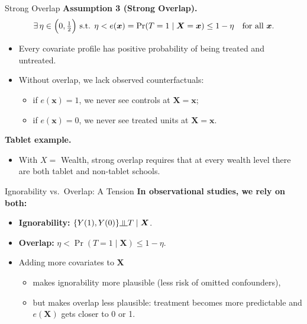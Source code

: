 \documentclass[10pt]{beamer}
\newcommand{\indep}{\rotatebox[origin=c]{90}{$\models$}}
\theoremstyle{plain}
\newcommand{\bx}{\bm{x}}
\newcommand{\bX}{\bm{X}}
\begin{document}
\begin{frame}{Strong Overlap}
  \textbf{Assumption 3 (Strong Overlap).}
  \[
    \exists\,\eta \in \Bigl(0,\tfrac{1}{2}\Bigr) \text{ s.t. } \eta < e(\bx) = \Pr(T=1 \mid \bX = \bx) \le 1-\eta
    \quad\text{for all } \bx.
  \]
  \pause
  \begin{itemize}
    \item Every covariate profile has positive probability of being treated and untreated.
    \item Without overlap, we lack observed counterfactuals:
    \pause
    \begin{itemize}
      \item if \(e(\bx)=1\), we never see controls at \(\bX=\bx\);
      \item if \(e(\bx)=0\), we never see treated units at \(\bX=\bx\).
    \end{itemize}
  \end{itemize}
  \vspace{0.5cm}
  \pause
  \textbf{Tablet example.}
  \begin{itemize}
    \item With \(X=\) Wealth, strong overlap requires that at every wealth level there are both tablet and non-tablet schools.
  \end{itemize}
\end{frame}

\begin{frame}{Ignorability vs.\ Overlap: A Tension}
  \textbf{In observational studies, we rely on both:}
  \begin{itemize}
    \item \textbf{Ignorability:} \(\{Y(1),Y(0)\} \indep T \mid \bX\).
    \item \textbf{Overlap:} \(\eta < \Pr(T=1 \mid \bX) \le 1-\eta\).
  \end{itemize}
  \pause
  \vspace{0.5cm}
  \begin{itemize}
    \item Adding more covariates to \(\bX\)
    \begin{itemize}
      \item makes ignorability more plausible (less risk of omitted confounders),
      \item but makes overlap less plausible: treatment becomes more predictable and \(e(\bX)\) gets closer to 0 or 1.
    \end{itemize}
  \end{itemize}
\end{frame}
\end{document}
